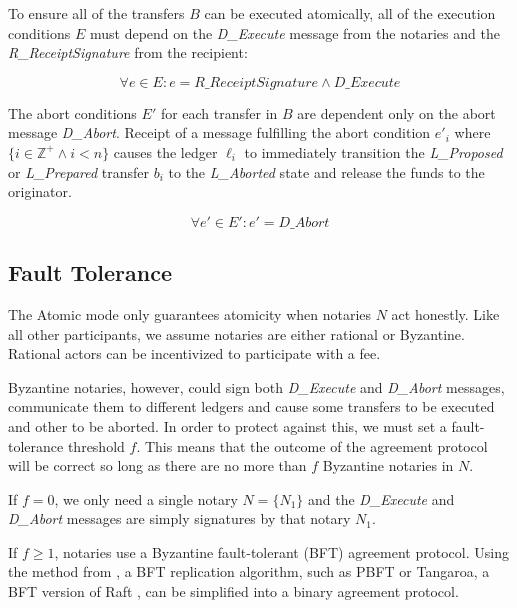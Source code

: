 \documentclass[letterpaper,twocolumn,10pt]{article}
\begin{document}
To ensure all of the transfers $B$ can be executed atomically, all of the execution conditions $E$ must depend on the \textit{D\_Execute} message from the notaries and the \textit{R\_ReceiptSignature} from the recipient:

\begin{equation}
\forall e \in E : e = \textit{R\_ReceiptSignature} \land \textit{D\_Execute}
\end{equation}

The abort conditions $E'$ for each transfer in $B$ are dependent only on the abort message \textit{D\_Abort}. Receipt of a message fulfilling the abort condition $e'_i$ where $\{ i \in \mathbb{Z}^+ \land i < n \}$ causes the ledger $\ell_i$ to immediately transition the \textit{L\_Proposed} or \textit{L\_Prepared} transfer $b_i$ to the \textit{L\_Aborted} state and release the funds to the originator.

\begin{equation}
\forall e' \in E' : e' = \textit{D\_Abort}
\end{equation}


\subsection{Fault Tolerance}
\label{subsec:fault-tolerance}

The Atomic mode only guarantees atomicity when notaries $N$ act honestly. Like all other participants, we assume notaries are either rational or Byzantine. Rational actors can be incentivized to participate with a fee.

Byzantine notaries, however, could sign both \textit{D\_Execute} and \textit{D\_Abort} messages, communicate them to different ledgers and cause some transfers to be executed and other to be aborted. In order to protect against this, we must set a fault-tolerance threshold $f$. This means that the outcome of the agreement protocol will be correct so long as there are no more than $f$ Byzantine notaries in $N$.

If $f = 0$, we only need a single notary $N = \{ N_1 \}$ and the \textit{D\_Execute} and \textit{D\_Abort} messages are simply signatures by that notary $N_1$.

If $f \geq 1$, notaries use a Byzantine fault-tolerant (BFT) agreement protocol. Using the method from \cite{gray2006consensus,mohan1983method}, a BFT replication algorithm, such as PBFT \cite{castro1999practical} or Tangaroa, a BFT version of Raft \cite{copelandtangaroa}, can be simplified into a binary agreement protocol.
\end{document}
